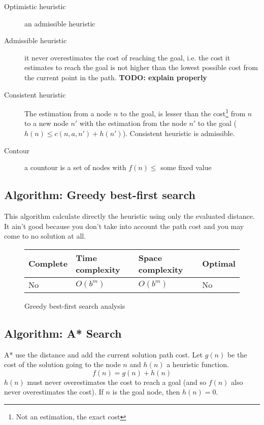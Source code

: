 \begin{description}
\item[Optimistic heuristic] an admissible heuristic
\item[Admissible heuristic] it never overestimates the cost of reaching the goal, i.e. the cost it estimates to reach the goal is not higher than the lowest possible cost from the current point in the path.\cite{wikiadmheur} \textbf{TODO: explain properly}
\item[Consistent heuristic] The estimation from a node $n$ to the goal, is lesser than the cost\footnote{Not an estimation, the exact cost} from $n$ to a new node $n'$ with the estimation from the node $n'$ to the goal ($h(n) \leq c(n,a,n')+h(n')$).
    Consistent heuristic is admissible.
\item[Contour] a countour is a set of nodes with $f(n) \leq$ some fixed value
\end{description}

\subsection{Algorithm: Greedy best-first search}

This algorithm calculate directly the heuristic using only the evaluated distance. It ain't good because you don't take into account the path cost and you may come to no solution at all. 

\begin{figure}[H]
\centering
\begin{tabular}{|llll|}
\hline
\textbf{Complete} & \textbf{Time complexity} & \textbf{Space complexity} & \textbf{Optimal} \\
\hline
No& $O(b^m)$ & $O(b^m)$ & No\\
\hline
\end{tabular}
\caption{Greedy best-first search analysis}
\end{figure}

\subsection{Algorithm: A* Search}

A* use the distance and add the current solution path cost. Let $g(n)$ be the cost of the solution going to the node $n$ and $h(n)$ a heuristic function.
$$f(n) = g(n) + h(n)$$
$h(n)$ must never overestimates the cost to reach a goal (and so $f(n)$ also never overestimates the cost). If $n$ is the goal node, then $h(n) = 0$.

